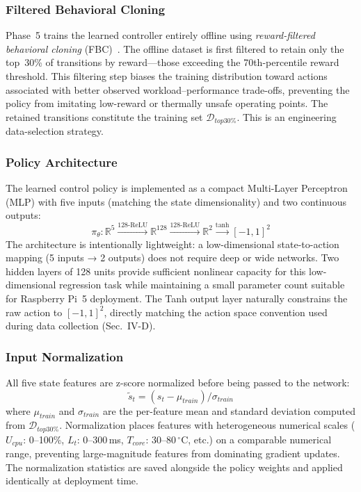 \documentclass{ieeeaccess}
\begin{document}
\subsubsection*{Filtered Behavioral Cloning}

Phase~5 trains the learned controller entirely offline using
\emph{reward-filtered behavioral cloning} (FBC)~\cite{b16}. The offline
dataset is first filtered to retain only the top~30\% of transitions by
reward---those exceeding the 70th-percentile reward threshold. This
filtering step biases the training distribution toward actions associated
with better observed workload–performance trade-offs, preventing the policy
from imitating low-reward or thermally unsafe operating points. The
retained transitions constitute the training set $\mathcal{D}_{top30\%}$.
This is an engineering data-selection strategy.

\subsubsection*{Policy Architecture}

The learned control policy is implemented as a compact Multi-Layer Perceptron (MLP) with five inputs (matching
the state dimensionality) and two continuous outputs:
\begin{equation}
\pi_\theta : \mathbb{R}^5 \xrightarrow{128\text{-ReLU}} \mathbb{R}^{128}
\xrightarrow{128\text{-ReLU}} \mathbb{R}^2 \xrightarrow{\tanh} [-1,1]^2
\end{equation}
The architecture is intentionally lightweight: a low-dimensional
state-to-action mapping (5 inputs → 2 outputs) does not require deep or
wide networks. Two hidden layers of 128 units provide sufficient nonlinear
capacity for this low-dimensional regression task while maintaining a small
parameter count suitable for Raspberry Pi~5 deployment. The Tanh output
layer naturally constrains the raw action to $[-1,1]^2$, directly matching
the action space convention used during data collection (Sec.~IV-D).

\subsubsection*{Input Normalization}

All five state features are z-score normalized before being passed to the
network:
\begin{equation}
\tilde{s}_t = (s_t - \mu_{train}) / \sigma_{train}
\end{equation}
where $\mu_{train}$ and $\sigma_{train}$ are the per-feature mean and
standard deviation computed from $\mathcal{D}_{top30\%}$. Normalization
places features with heterogeneous numerical scales ($U_{cpu}$: 0--100\%,
$L_t$: 0--300\,ms, $T_{core}$: 30--80\,$^\circ$C, etc.) on a comparable
numerical range, preventing large-magnitude features from dominating
gradient updates. The normalization statistics are saved alongside the
policy weights and applied identically at deployment time.
\end{document}
